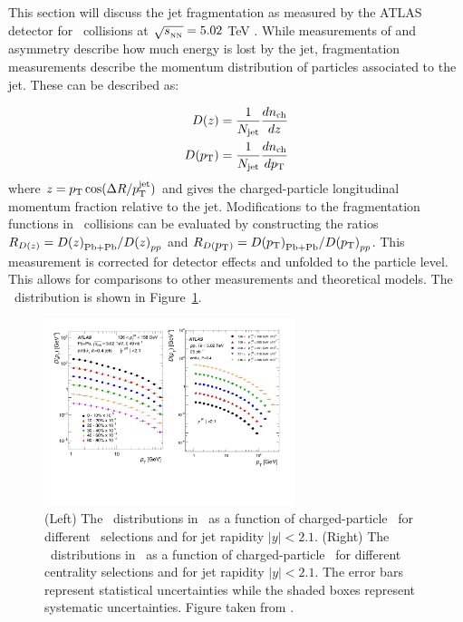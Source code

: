 
This section will discuss the jet fragmentation as measured by the ATLAS detector for \pbpb\ collisions at $\mbox{$\sqrt{s_{_\text{NN}}}$} = 5.02$ TeV \cite{PhysRevC.98.024908}.
While measurements of \RAA \cite{20151, Aad:2014bxa, Khachatryan:2016jfl} and asymmetry \cite{Aaboud:2017eww, Chatrchyan:2011sx, PhysRevLett.119.062301} describe how much energy is lost by the jet, fragmentation measurements describe the momentum distribution of particles associated to the jet.
These can be described as:

\begin{align}
\mbox{$D(z)$} = \frac{1}{\mbox{$N_{\mathrm{jet}}$}} \frac{d\mbox{$n_{\mathrm{ch}}$}}{dz} \\
\mbox{$D(\mbox{$p_{\mathrm{T}}$})$} = \frac{1}{\mbox{$N_{\mathrm{jet}}$}} \frac{d\mbox{$n_{\mathrm{ch}}$}}{d\mbox{$p_{\mathrm{T}}$}}
\end{align}
where $z = \mbox{$p_{\mathrm{T}}$} \cos(\Delta R / \mbox{$p_{\mathrm{T}}^{\mathrm{jet}}$})$ and gives the charged-particle longitudinal momentum fraction relative to the jet.
Modifications to the fragmentation functions in \pbpb\ collisions can be evaluated by constructing the ratios $\mbox{$R_{D(z)}$} = \mbox{$D(z)$}_{\rm Pb+Pb} / \mbox{$D(z)$}_{pp}$ and $\mbox{$R_{D(\mbox{$p_{\mathrm{T}}$})}$} = \mbox{$D(\mbox{$p_{\mathrm{T}}$})$}_{\rm Pb+Pb} / \mbox{$D(\mbox{$p_{\mathrm{T}}$})$}_{pp}$.
This measurement is corrected for detector effects and unfolded to the particle level.
This allows for comparisons to other measurements and theoretical models.
The \Dpt\ distribution is shown in Figure~\ref{fig:jetff_dpt}.

\begin{figure}[htbp]
\begin{center}
\includegraphics[width=0.65\textwidth]{figures/jetMeasurements/jetff_dpt}
\caption{(Left) The \Dpt\ distributions in \pp\ as a function of charged-particle \pt\ for different \ptjet\ selections and for jet rapidity $|y| < 2.1$.
(Right) The \Dpt\ distributions in \pbpb\ as a function of charged-particle \pt\ for different centrality selections and for jet rapidity $|y| < 2.1$.
The error bars represent statistical uncertainties while the shaded boxes represent systematic uncertainties.
Figure taken from \cite{PhysRevC.98.024908}.}
\label{fig:jetff_dpt}
\end{center}
\end{figure}


